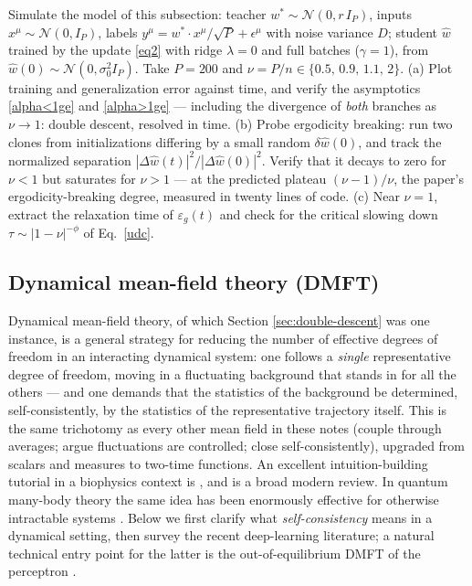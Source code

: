 \documentclass[11pt]{article}
\newcommand{\CN}{{\mathcal N}}
\begin{document}
\begin{exercise}
\label{ex:li-goldenfeld}
Simulate the model of this subsection: teacher $w^* \sim \CN(0, r\, I_P)$, inputs $x^\mu \sim \CN(0, I_P)$, labels $y^\mu = w^*\cdot x^\mu/\sqrt P + \epsilon^\mu$ with noise variance $D$; student $\hat w$ trained by the update \eqref{eq2} with ridge $\lambda = 0$ and full batches ($\gamma = 1$), from $\hat w(0)\sim\CN(0,\sigma_0^2 I_P)$. Take $P = 200$ and $\nu = P/n \in \{0.5,\, 0.9,\, 1.1,\, 2\}$.
(a) Plot training and generalization error against time, and verify the asymptotics \eqref{alpha<1ge} and \eqref{alpha>1ge} --- including the divergence of \emph{both} branches as $\nu\to1$: double descent, resolved in time.
(b) Probe ergodicity breaking: run two clones from initializations differing by a small random $\delta\hat w(0)$, and track the normalized separation $|\Delta \hat w(t)|^2/|\Delta\hat w(0)|^2$. Verify that it decays to zero for $\nu<1$ but saturates for $\nu>1$ --- at the predicted plateau $(\nu-1)/\nu$, the paper's ergodicity-breaking degree, measured in twenty lines of code.
(c) Near $\nu=1$, extract the relaxation time of $\varepsilon_g(t)$ and check for the critical slowing down $\tau \sim |1-\nu|^{-\phi}$ of Eq.~\eqref{udc}.
\end{exercise}
%


\subsection{Dynamical mean-field theory (DMFT)}
\label{sec:DMFT-general}

Dynamical mean-field theory, of which Section \ref{sec:double-descent} was one instance, is a general strategy for reducing the number of effective degrees of freedom in an interacting dynamical system: one follows a \emph{single} representative degree of freedom, moving in a fluctuating background that stands in for all the others --- and one demands that the statistics of the background be determined, self-consistently, by the statistics of the representative trajectory itself. This is the same trichotomy as every other mean field in these notes (couple through averages; argue fluctuations are controlled; close self-consistently), upgraded from scalars and measures to two-time functions. An excellent intuition-building tutorial in a biophysics context is \cite{blumenthalBuildingIntuitionDynamical2025}, and \cite{cugliandoloRecentApplicationsDynamical2023} is a broad modern review. In quantum many-body theory the same idea has been enormously effective for otherwise intractable systems \cite{georgesDynamicalMeanfieldTheory1996,KotliarDMFT}. Below we first clarify what \emph{self-consistency} means in a dynamical setting, then survey the recent deep-learning literature; a natural technical entry point for the latter is the out-of-equilibrium DMFT of the perceptron \cite{agoritsas}.
\end{document}
